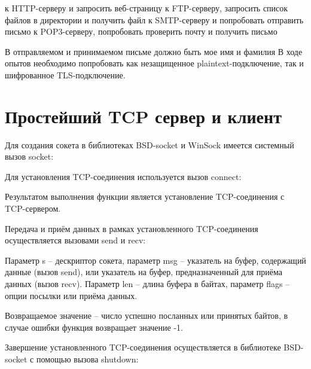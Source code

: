 \begin{itemize}
 к HTTP-серверу и запросить веб-страницу
 к FTP-серверу, запросить список файлов в директории и получить файл
 к SMTP-серверу и попробовать отправить письмо
 к POP3-серверу, попробовать проверить почту и получить письмо
\end{itemize}

В отправляемом и принимаемом письме должно быть мое имя и фамилия В ходе опытов необходимо попробовать как незащищенное plaintext-подключение, так и шифрованное TLS-подключение.

\section{Простейший TCP сервер и клиент}

Для создания сокета в библиотеках BSD-socket и WinSock имеется системный вызов socket:

\vspace{5mm}


\parindent=1cm

\vspace{5mm}

Для установления TCP-соединения используется вызов connect:


\parindent=1cm

Результатом выполнения функции является установление TCP-соединения с TCP-сервером.

\vspace{5mm}

Передача и приём данных в рамках установленного TCP-соединения осуществляется вызовами send и recv:


\parindent=1cm

Параметр s – дескриптор сокета, параметр msg – указатель на буфер, содержащий данные (вызов send), или указатель на буфер, предназначенный для приёма данных (вызов recv). Параметр len – длина буфера в байтах, параметр flags – опции посылки или приёма данных.

Возвращаемое значение – число успешно посланных или принятых байтов, в случае ошибки функция возвращает значение -1.

Завершение установленного TCP-соединения осуществляется в библиотеке BSD-socket с помощью вызова shutdown:

